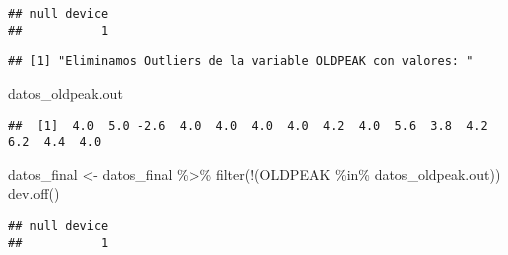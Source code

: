 \documentclass[
]{article}
\newenvironment{Shaded}{\begin{snugshade}}{\end{snugshade}}
\newcommand{\FunctionTok}[1]{\textcolor[rgb]{0.94,0.94,0.56}{#1}}
\newcommand{\NormalTok}[1]{\textcolor[rgb]{0.80,0.80,0.80}{#1}}
\newcommand{\OtherTok}[1]{\textcolor[rgb]{0.94,0.94,0.56}{#1}}
\newcommand{\SpecialCharTok}[1]{\textcolor[rgb]{0.86,0.64,0.64}{#1}}
\newcommand{\StringTok}[1]{\textcolor[rgb]{0.80,0.58,0.58}{#1}}
\begin{document}
\begin{verbatim}
## null device 
##           1
\end{verbatim}

\begin{Shaded}
\end{Shaded}

\begin{verbatim}
## [1] "Eliminamos Outliers de la variable OLDPEAK con valores: "
\end{verbatim}

\begin{Shaded}
\begin{Highlighting}[]
\NormalTok{datos\_oldpeak.out}
\end{Highlighting}
\end{Shaded}

\begin{verbatim}
##  [1]  4.0  5.0 -2.6  4.0  4.0  4.0  4.0  4.2  4.0  5.6  3.8  4.2  6.2  4.4  4.0
\end{verbatim}

\begin{Shaded}
\begin{Highlighting}[]
\NormalTok{datos\_final }\OtherTok{\textless{}{-}}\NormalTok{ datos\_final }\SpecialCharTok{\%\textgreater{}\%} \FunctionTok{filter}\NormalTok{(}\SpecialCharTok{!}\NormalTok{(OLDPEAK }\SpecialCharTok{\%in\%}\NormalTok{ datos\_oldpeak.out))}
\FunctionTok{dev.off}\NormalTok{()}
\end{Highlighting}
\end{Shaded}

\begin{verbatim}
## null device 
##           1
\end{verbatim}

\begin{Shaded}
\end{Shaded}
\end{document}
